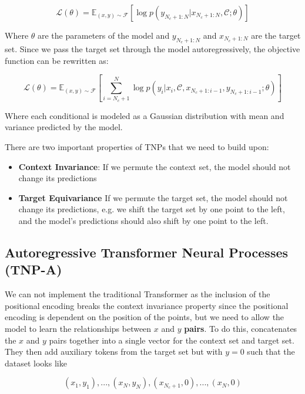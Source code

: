 \documentclass[main.tex]{subfiles}
\begin{document}
\begin{equation}
	\mathcal{L}(\theta) = \mathbb{E}_{(x, y) \sim \mathcal{F}} \left[ \log p(y_{N_c+1:N} | x_{N_c+1:N}, \mathcal{C}; \theta) \right]
	\end{equation}

Where $\theta$ are the parameters of the model and $y_{N_c+1:N}$ and $x_{N_c+1:N}$ are the target set. Since we pass the target set through the model autoregressively, the objective function can be rewritten as:

\begin{equation}
	\mathcal{L}(\theta) = \mathbb{E}_{(x, y) \sim \mathcal{F}} \left[ \sum_{i=N_c+1}^{N} \log p(y_i | x_i, \mathcal{C}, x_{N_c+1:i-1}, y_{N_c+1:i-1}; \theta) \right]
\end{equation}

Where each conditional is modeled as a Gaussian distribution with mean and variance predicted by the model. 

There are two important properties of TNPs that we need to build upon:

\begin{itemize}
	\item \textbf{Context Invariance}: If we permute the context set, the model should not change its predictions
	 \item \textbf{Target Equivariance} If we permute the target set, the model should not change its predictions, e.g. we shift the target set by one point to the left, and the model's predictions should also shift by one point to the left.
\end{itemize}

\subsection{Autoregressive Transformer Neural Processes (TNP-A)}

We can not implement the traditional Transformer as the inclusion of the positional encoding breaks the context invariance property since the positional encoding is dependent on the position of the points, but we need to allow the model to learn the relationships between $x$ and $y$ \textbf{pairs}. To do this, \cite{nguyen2023transformer} concatenates the $x$ and $y$ pairs together into a single vector for the context set and target set. They then add auxiliary tokens from the target set but with $y=0$ such that the dataset looks like

\[
	 {(x_1, y_1), . . . ,(x_N , y_N ),(x_{N_c+1}, 0), . . . ,(x_N , 0)}
\]
\end{document}
